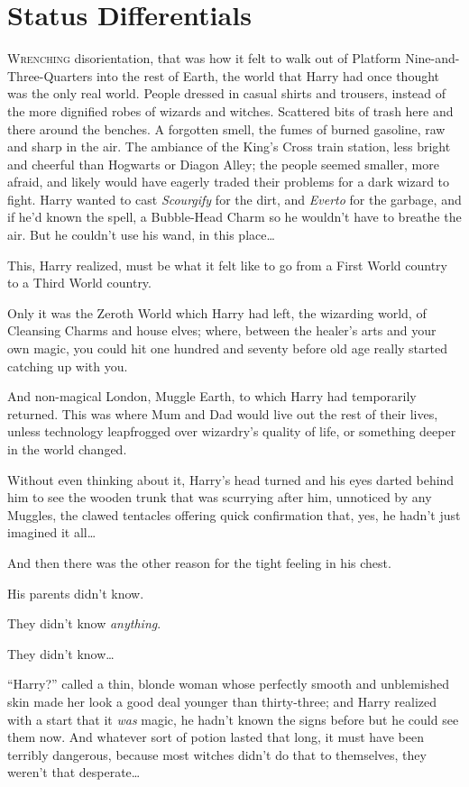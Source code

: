 \chapter{Status Differentials}

\lettrine{W}{renching} disorientation, that was how it felt to walk out of Platform Nine-and-Three-Quarters into the rest of Earth, the world that Harry had once thought was the only real world. People dressed in casual shirts and trousers, instead of the more dignified robes of wizards and witches. Scattered bits of trash here and there around the benches. A forgotten smell, the fumes of burned gasoline, raw and sharp in the air. The ambiance of the King’s Cross train station, less bright and cheerful than Hogwarts or Diagon Alley; the people seemed smaller, more afraid, and likely would have eagerly traded their problems for a dark wizard to fight. Harry wanted to cast \emph{Scourgify} for the dirt, and \emph{Everto} for the garbage, and if he’d known the spell, a Bubble-Head Charm so he wouldn’t have to breathe the air. But he couldn’t use his wand, in this place…

This, Harry realized, must be what it felt like to go from a First World country to a Third World country.

Only it was the Zeroth World which Harry had left, the wizarding world, of Cleansing Charms and house elves; where, between the healer’s arts and your own magic, you could hit one hundred and seventy before old age really started catching up with you.

And non-magical London, Muggle Earth, to which Harry had temporarily returned. This was where Mum and Dad would live out the rest of their lives, unless technology leapfrogged over wizardry’s quality of life, or something deeper in the world changed.

Without even thinking about it, Harry’s head turned and his eyes darted behind him to see the wooden trunk that was scurrying after him, unnoticed by any Muggles, the clawed tentacles offering quick confirmation that, yes, he hadn’t just imagined it all…

And then there was the other reason for the tight feeling in his chest.

His parents didn’t know.

They didn’t know \emph{anything}.

They didn’t know…

“Harry?” called a thin, blonde woman whose perfectly smooth and unblemished skin made her look a good deal younger than thirty-three; and Harry realized with a start that it \emph{was} magic, he hadn’t known the signs before but he could see them now. And whatever sort of potion lasted that long, it must have been terribly dangerous, because most witches didn’t do that to themselves, they weren’t that desperate…

